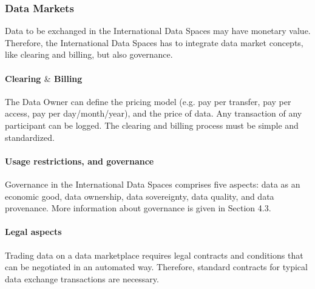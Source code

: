 \subsubsection{Data Markets}
Data to be exchanged in the International Data Spaces may have monetary value. Therefore, the International Data Spaces has to integrate data market concepts, like clearing and billing, but also governance.

\paragraph{Clearing $\&$  Billing\\}
The Data Owner can define the pricing model (e.g. pay per transfer, pay per access, pay per day/month/year), and the price of data. Any transaction of any participant can be logged. The clearing and billing process must be simple and standardized.


\paragraph{Usage restrictions, and governance\\}
Governance in the International Data Spaces comprises five aspects: data as an economic good, data ownership, data sovereignty, data quality, and data provenance. More information about governance is given in Section 4.3. %

\paragraph{Legal aspects\\}
Trading data on a data marketplace requires legal contracts and conditions that can be negotiated in an automated way. Therefore, standard contracts for typical data exchange transactions are necessary.  
